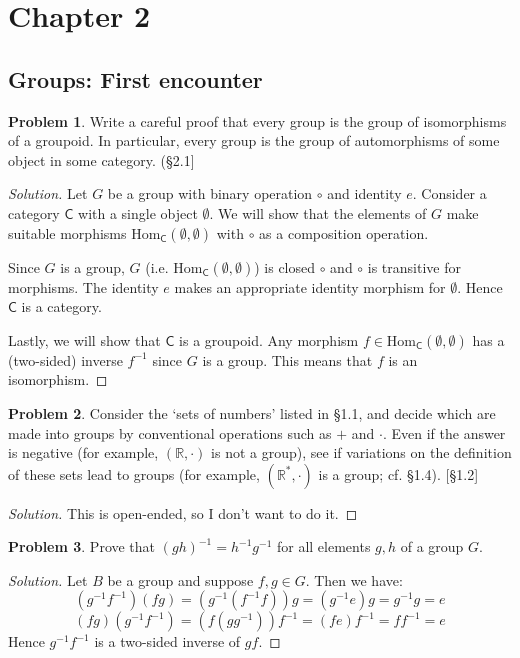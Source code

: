 \documentclass[fontsize=14pt]{scrartcl}
\theoremstyle{definition}
\newtheorem{problem-internal}{Problem}[subsection]
\newenvironment{problem}{
  \medskip
  \begin{problem-internal}
}{
  \end{problem-internal}
}
\newenvironment{solution}{
  \begin{proof}[Solution]
  \vspace{-8px}
  \setlength{\parskip}{4px}
  \setlength{\parindent}{0px}
}{
  \end{proof}
}
\newcommand{\Hom}{\mathrm{Hom}}
\newcommand{\inv}[1]{#1^{-1}}
\begin{document}
\section*{Chapter 2}
\subsection*{Groups: First encounter}
\setcounter{subsection}{1}


\begin{problem}
Write a careful proof that every group is the group of isomorphisms of a
groupoid. In particular, every group is the group of automorphisms of some
object in some category. (\S2.1]
\end{problem}
\begin{solution}
\def \C {\mathsf{C}}
Let $G$ be a group with binary operation $\circ$ and identity $e$. Consider a
category $\C$ with a single object $\emptyset$. We will show that the elements
of $G$ make suitable morphisms $\Hom_\C(\emptyset,\emptyset)$ with $\circ$ as a
composition operation.

Since $G$ is a group, $G$ (i.e. $\Hom_\C(\emptyset,
\emptyset)$) is closed $\circ$ and $\circ$ is transitive for morphisms. The
identity $e$ makes an appropriate identity morphism for $\emptyset$. Hence $\C$
is a category.

Lastly, we will show that $\C$ is a groupoid. Any morphism
$f\in\Hom_\C(\emptyset, \emptyset)$ has a (two-sided) inverse $f^{-1}$ since $G$
is a group. This means that $f$ is an isomorphism.
\end{solution}


\begin{problem}
Consider the `sets of numbers' listed in \S1.1, and decide which are made into
groups by conventional operations such as $+$ and $\cdot$. Even if the answer is
negative (for example, $(\mathbb{R},\cdot)$ is not a group), see if variations
on the definition of these sets lead to groups (for example,
$(\mathbb{R}^*,\cdot)$ is a group; cf. \S1.4). [\S1.2]
\end{problem}
\begin{solution}
This is open-ended, so I don't want to do it.
\end{solution}

\begin{problem}
Prove that $\inv{(gh)} = \inv{h}\inv{g}$ for all elements $g,h$ of a group $G$.
\end{problem}
\begin{solution}
Let $B$ be a group and suppose $f,g\in G$. Then we have:
%
\[ (\inv{g}\inv{f})(fg) = (\inv{g}(\inv{f}f))g = (\inv{g}e)g = \inv{g}g = e \]
\[ (fg)(\inv{g}\inv{f}) = (f(g\inv{g}))\inv{f} = (fe)\inv{f} = f\inv{f} = e \]
%
Hence $\inv{g}\inv{f}$ is a two-sided inverse of $gf$.
\end{solution}
\end{document}
